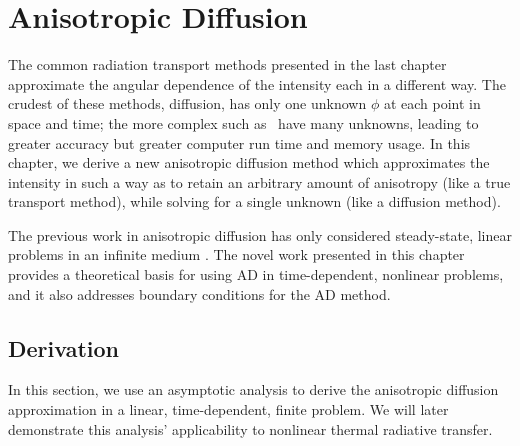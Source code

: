 
\chapter{Anisotropic Diffusion}\label{chap:adDerivation}

The common radiation transport methods presented
in the last chapter approximate the angular dependence of the intensity each
in a different way. The crudest of these methods, diffusion, has only one
unknown
$\phi$ at each point in space and time; the more complex such as \SN\ have many
unknowns, leading to greater accuracy but greater computer run time and memory
usage. In this chapter, we derive a new anisotropic diffusion method which
approximates the intensity in such a way as to retain an arbitrary amount of
anisotropy (like a true transport method), while solving for a single unknown
(like a diffusion method).

The previous work in anisotropic diffusion has only considered steady-state,
linear problems in an infinite medium \cite{Lar2009c,Mor2007}. The novel work
presented in this chapter provides a
theoretical basis for using AD in time-dependent, nonlinear problems, and it
also addresses boundary conditions for the AD method.

\section{Derivation}\label{sec:adDerivation}

In this section, we use an asymptotic analysis to derive the anisotropic
diffusion approximation in a linear, time-dependent, finite problem. We will
later demonstrate this analysis' applicability to nonlinear thermal radiative
transfer.

